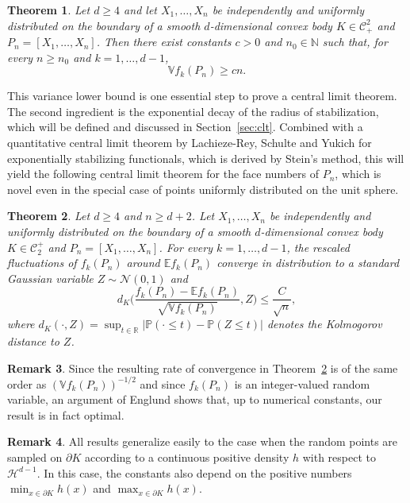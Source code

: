 \documentclass[12pt]{article}
\newcommand{\IP}{\mathds{P}}
\newcommand{\IR}{\mathds{R}}
\def\E{{\mathds E}}
\def\N{{\mathds N}}
\def\V{{\mathds V}}
\def\cC{{\mathcal C}}
\def\cH{{\mathcal H}}
\def\cN{{\mathcal N}}
\newtheorem{theorem}{Theorem}[section]
\theoremstyle{definition}
\newtheorem{remark}[theorem]{Remark}
\begin{document}
\begin{theorem}\label{thm:var}
	Let $d\ge 4$ and let $X_1,\dots,X_n$ be independently and uniformly distributed on the boundary of a smooth $d$-dimensional convex body $K\in \mathcal{C}^2_+$ and $P_n=[X_1,\dots,X_n]$. Then there exist constants $c>0$ and $n_0\in \N$ such that, for every $n\ge n_0$ and $k=1,\dots,d-1$,
$$
\V f_k(P_n)\ge c n.
$$
\end{theorem}

This variance lower bound is one essential step to prove a central limit theorem. The second ingredient is the exponential decay of the radius of stabilization, which will be defined and discussed in Section~\ref{sec:clt}. Combined with a quantitative central limit theorem by Lachieze-Rey, Schulte and Yukich \cite{LachSchulteYukich} for exponentially stabilizing functionals, which is derived by Stein's method, this will yield the following central limit theorem for the face numbers of $P_n$, which is novel even in the special case of points uniformly distributed on the unit sphere.

\begin{theorem}\label{thm:CLT}
	Let $d\ge 4$ and $n\ge d+2$. Let $X_1,\dots,X_n$ be independently and uniformly distributed on the boundary of a smooth $d$-dimensional convex body $K\in \cC_{2}^+$ and $P_n=[X_1,\dots,X_n]$. For every $k=1,\dots,d-1$, the rescaled fluctuations of $f_k(P_n)$ around $\E f_k(P_n)$ converge in distribution to a standard Gaussian variable $Z \sim \cN(0,1)$ and 
$$
d_K \Big(\frac{f_k(P_n)-\E f_k(P_n)}{\sqrt{\V f_k(P_n)}},Z\Big)
\le \frac{C}{\sqrt{n}} ,
$$
where $d_K(\cdot,Z)=\sup_{t\in \IR}|\IP(\cdot\le t)-\IP(Z\le t)|$ denotes the Kolmogorov distance to $Z$. 
\end{theorem}

\begin{remark}
Since the resulting rate of convergence in Theorem~\ref{thm:CLT} is of the same order as $(\V  f_k(P_n))^{-1/2}$ and since $f_k(P_n)$ is an integer-valued random variable, an argument of Englund \cite[Section 6]{Englund} shows that, up to numerical constants, our result is in fact optimal.
\end{remark}

\begin{remark}
	All results generalize easily to the case when the random points are sampled on $\partial K$ according to a continuous positive density $h$ with respect to $\cH^{d-1}$. In this case, the constants also depend on the positive numbers $\min_{x\in \partial K}h(x)$ and $\max_{x\in \partial K}h(x)$.
\end{remark}
\end{document}
